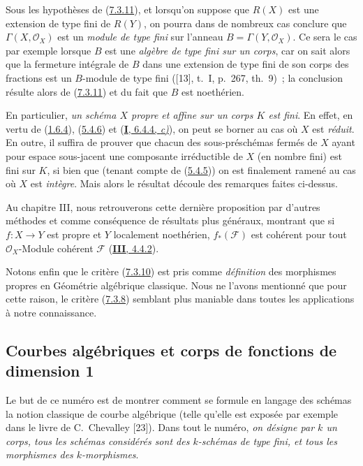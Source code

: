 \begin{remark}[7.3.12]
\label{II.7.3.12-fr}
Sous les hypothèses de (\hyperref[II.7.3.11-fr]{7.3.11}), et lorsqu'on suppose
que $R(X)$ est une extension de type fini de $R(Y)$, on pourra dans de nombreux
cas conclure que $\Gamma(X,\mathcal{O}_X)$ est un \emph{module de type fini}
sur l'anneau $B=\Gamma(Y,\mathcal{O}_X)$. Ce sera le cas par exemple lorsque
$B$ est une \emph{algèbre de type fini sur un corps}, car on sait alors que la
fermeture intégrale de $B$ dans une extension de type fini de son corps des
fractions est un $B$-module de type fini ([13], t.~I, p.~267, th.~9)~; la
conclusion résulte alors de (\hyperref[II.7.3.11-fr]{7.3.11}) et du fait que
$B$ est noethérien.

En particulier, \emph{un schéma $X$ propre et affine sur un corps $K$ est
fini}. En effet, en vertu de (\hyperref[II.1.6.4-fr]{1.6.4}),
(\hyperref[II.5.4.6-fr]{5.4.6}) et
(\hyperref[I.6.4.4-fr]{\textbf{I}, 6.4.4, \emph{c)}}), on peut se borner au cas où $X$ est
\emph{réduit}. En outre, il suffira de prouver que chacun des sous-préschémas
fermés de $X$ ayant pour espace sous-jacent une composante irréductible de $X$
(en nombre fini) est fini sur $K$, si bien que (tenant compte de
(\hyperref[II.5.4.5-fr]{5.4.5})) on est finalement ramené au cas où $X$ est
\emph{intègre}. Mais alors le résultat découle des remarques faites ci-dessus.

Au chapitre III, nous retrouverons cette dernière proposition par d'autres
méthodes et comme conséquence de résultats plus généraux, montrant que si
$f:X\to Y$ est propre et $Y$ localement noethérien, $f_*(\mathcal{F})$ est
cohérent pour tout $\mathcal{O}_X$-Module cohérent $\mathcal{F}$
(\hyperref[III.4.4.2-fr]{\textbf{III}, 4.4.2}).

Notons enfin que le critère (\hyperref[II.7.3.10-fr]{7.3.10}) est pris comme
\emph{définition} des morphismes propres en Géométrie algébrique classique.
Nous ne l'avons mentionné que pour cette raison, le critère
(\hyperref[II.7.3.8-fr]{7.3.8}) semblant plus maniable dans toutes les
applications à notre connaissance.
\end{remark}

\subsection{Courbes algébriques et corps de fonctions de dimension 1}
\label{subsection:II.7.4-fr}

Le but de ce numéro est de montrer comment se formule en langage des schémas
la notion classique de courbe algébrique (telle qu'elle est exposée par
exemple dans le livre de C.~Chevalley [23]). Dans tout le numéro, \emph{on
désigne par $k$ un corps, tous les schémas considérés sont des $k$-schémas de
type fini, et tous les morphismes des $k$-morphismes}.

